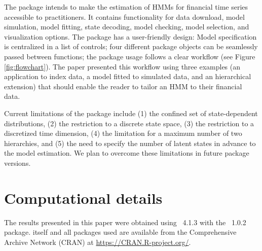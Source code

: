 \documentclass[article]{jss}
\begin{document}
The  package intends to make the estimation of HMMs for financial time series accessible to practitioners. It contains functionality for data download, model simulation, model fitting, state decoding, model checking, model selection, and visualization options. The package has a user-friendly design: Model specification is centralized in a list of controls; four different package objects can be seamlessly passed between functions; the package usage follows a clear workflow (see Figure \ref{fig:flowchart}). The paper presented this workflow using three examples (an application to index data, a model fitted to simulated data, and an hierarchical extension) that should enable the reader to tailor an HMM to their financial data.

Current limitations of the  package include (1) the confined set of state-dependent distributions, (2) the restriction to a discrete state space, (3) the restriction to a discretized time dimension, (4) the limitation for a maximum number of two hierarchies, and (5) the need to specify the number of latent states in advance to the model estimation. We plan to overcome these limitations in future package versions.


\section*{Computational details}

The results presented in this paper were obtained using
~4.1.3 with the
~1.0.2 package.  itself
and all packages used are available from the Comprehensive
 Archive Network (CRAN) at \url{https://CRAN.R-project.org/}.



\end{document}
